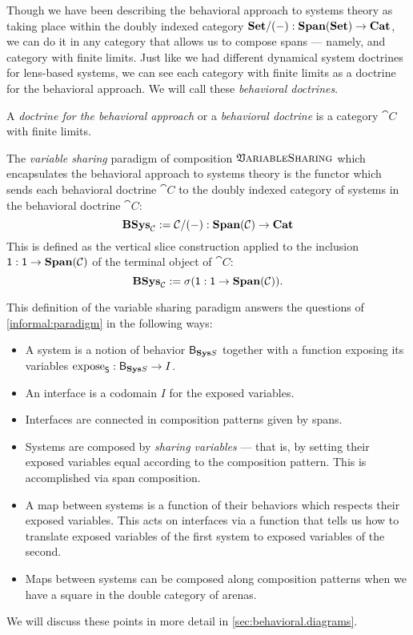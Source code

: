 \documentclass[DynamicalBook]{subfiles}
\begin{document}
Though we have been describing the behavioral approach to systems theory as
taking place within the doubly indexed category $\textbf{Set}/(-) :
\textbf{Span}(\textbf{Set}) \to \textbf{Cat}$, we can do it in any category that allows
us to compose spans --- namely, and category with finite limits. Just like we
had different dynamical system doctrines for lens-based systems, we can see each
category with finite limits as a doctrine for the behavioral approach. We will
call these \emph{behavioral doctrines}.

\begin{definition}
A \emph{doctrine for the behavioral approach} or a \emph{behavioral doctrine} is a
category $\cat{C}$ with finite limits.

The \emph{variable sharing} paradigm of composition $\mathfrak{V}\textsc{ariableSharing}$ which encapsulates the behavioral approach to systems theory is the functor which sends each behavioral doctrine $\cat{C}$ to the doubly indexed category of systems in
the behavioral doctrine $\cat{C}$:
$$\textbf{BSys}_{\mathcal{C}} := \mathcal{C}/(-) : \textbf{Span}(\mathcal{C}) \to \textbf{Cat}$$
This is defined as the vertical slice construction applied to the inclusion $\mathsf{1} :
\mathsf{1} \to \textbf{Span}(\mathcal{C})$ of the terminal object of $\cat{C}$:
\[
\textbf{BSys}_{\mathcal{C}} := \sigma(\mathsf{1} : \mathsf{1} \to \textbf{Span}(\mathcal{C})).
\]
\end{definition}

This definition of the variable sharing paradigm answers the questions of \cref{informal:paradigm} in the following ways:
\begin{itemize}
        \item A system is a notion of behavior $\mathsf{B}_{\textbf{Sys}{S}}$ together with a function exposing its variables $\mathrm{expose}_{\mathsf{S}} : \mathsf{B}_{{\textbf{Sys}{S}}} \to I$.
      \item An interface is a codomain $I$ for the exposed variables.
      \item Interfaces are connected in composition patterns given by spans.
        \item Systems are composed by \emph{sharing variables} --- that is, by setting their exposed variables equal according to the composition pattern. This is accomplished via span composition.
  \item A map between systems is a function of their behaviors which respects their exposed variables. This acts on interfaces via a function that tells us how to translate exposed variables of the first system to exposed variables of the second.
        \item Maps between systems can be composed along composition patterns when we have a square in the double category of arenas.
\end{itemize}
We will discuss these points in more detail in \cref{sec:behavioral.diagrams}.
\end{document}
